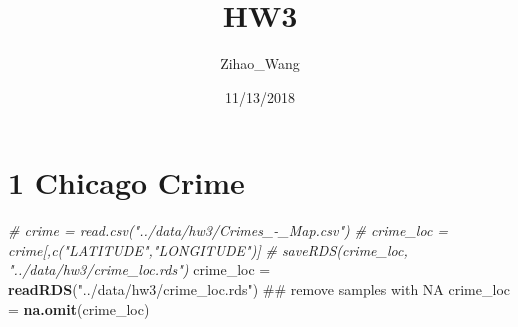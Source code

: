 \documentclass[]{article}
\title{HW3}
\author{Zihao\_Wang}
\date{11/13/2018}
\newenvironment{Shaded}{\begin{snugshade}}{\end{snugshade}}
\newcommand{\KeywordTok}[1]{\textcolor[rgb]{0.13,0.29,0.53}{\textbf{#1}}}
\newcommand{\DataTypeTok}[1]{\textcolor[rgb]{0.13,0.29,0.53}{#1}}
\newcommand{\DecValTok}[1]{\textcolor[rgb]{0.00,0.00,0.81}{#1}}
\newcommand{\StringTok}[1]{\textcolor[rgb]{0.31,0.60,0.02}{#1}}
\newcommand{\CommentTok}[1]{\textcolor[rgb]{0.56,0.35,0.01}{\textit{#1}}}
\newcommand{\OperatorTok}[1]{\textcolor[rgb]{0.81,0.36,0.00}{\textbf{#1}}}
\newcommand{\NormalTok}[1]{#1}
\begin{document}
\maketitle

\begin{Shaded}
\end{Shaded}

\section{1 Chicago Crime}\label{chicago-crime}

\begin{Shaded}
\begin{Highlighting}[]
\CommentTok{# crime = read.csv("../data/hw3/Crimes_-_Map.csv")}
\CommentTok{# crime_loc = crime[,c("LATITUDE","LONGITUDE")]}
\CommentTok{# saveRDS(crime_loc, "../data/hw3/crime_loc.rds")}
\NormalTok{crime_loc =}\StringTok{ }\KeywordTok{readRDS}\NormalTok{(}\StringTok{"../data/hw3/crime_loc.rds"}\NormalTok{)}
\NormalTok{## remove samples with NA}
\NormalTok{crime_loc =}\StringTok{ }\KeywordTok{na.omit}\NormalTok{(crime_loc)}
\end{Highlighting}
\end{Shaded}
\end{document}
